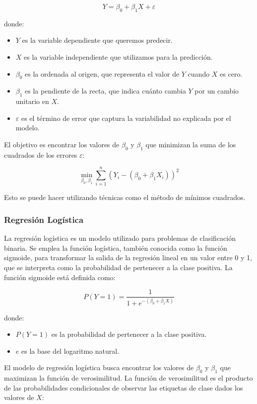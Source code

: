 \documentclass[12pt]{article}
\begin{document}
\[
Y = \beta_0 + \beta_1 X + \varepsilon
\]

donde:
\begin{itemize}
    \item \(Y\) es la variable dependiente que queremos predecir.
    \item \(X\) es la variable independiente que utilizamos para la predicción.
    \item \(\beta_0\) es la ordenada al origen, que representa el valor de \(Y\) cuando \(X\) es cero.
    \item \(\beta_1\) es la pendiente de la recta, que indica cuánto cambia \(Y\) por un cambio unitario en \(X\).
    \item \(\varepsilon\) es el término de error que captura la variabilidad no explicada por el modelo.
\end{itemize}

El objetivo es encontrar los valores de \(\beta_0\) y \(\beta_1\) que minimizan la suma de los cuadrados de los errores \(\varepsilon\):

\[
\min_{\beta_0, \beta_1} \sum_{i=1}^{n} (Y_i - (\beta_0 + \beta_1 X_i))^2
\]

Esto se puede hacer utilizando técnicas como el método de mínimos cuadrados.

\subsubsection{Regresión Logística}

La regresión logística es un modelo utilizado para problemas de clasificación binaria. Se emplea la función logística, también conocida como la función sigmoide, para transformar la salida de la regresión lineal en un valor entre 0 y 1, que se interpreta como la probabilidad de pertenecer a la clase positiva. La función sigmoide está definida como:

\[
P(Y=1) = \frac{1}{1 + e^{-(\beta_0 + \beta_1 X)}}
\]

donde:
\begin{itemize}
    \item \(P(Y=1)\) es la probabilidad de pertenecer a la clase positiva.
    \item \(e\) es la base del logaritmo natural.
\end{itemize}

El modelo de regresión logística busca encontrar los valores de \(\beta_0\) y \(\beta_1\) que maximizan la función de verosimilitud. La función de verosimilitud es el producto de las probabilidades condicionales de observar las etiquetas de clase dados los valores de \(X\):
\end{document}
